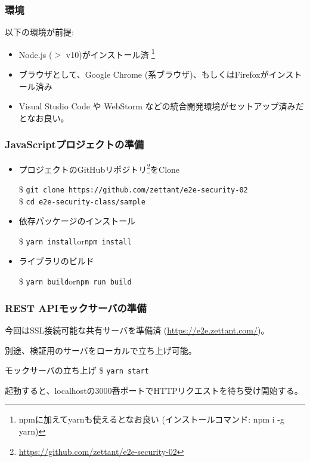 \documentclass[12pt,dvipdfmx]{beamer}
\begin{document}
\begin{frame}
\frametitle{環境}
以下の環境が前提:
\begin{itemize}
 \item Node.js ($>$ v10)がインストール済 \footnote[frame]{npmに加えてyarnも使えるとなお良い (インストールコマンド: npm i -g yarn)}
 \item ブラウザとして、Google Chrome (系ブラウザ)、もしくはFirefoxがインストール済み
 \item Visual Studio Code や WebStorm などの統合開発環境がセットアップ済みだとなお良い。
\end{itemize}
\end{frame}

\begin{frame}
\frametitle{JavaScriptプロジェクトの準備}
\begin{itemize}
\item プロジェクトのGitHubリポジトリ\footnote[frame]{\url{https://github.com/zettant/e2e-security-02}}をClone\\
\begin{exampleblock}{}
\footnotesize
\$ \texttt{git clone https://github.com/zettant/e2e-security-02}\\
\$ \texttt{cd e2e-security-class/sample}
\end{exampleblock}
\item 依存パッケージのインストール
\begin{exampleblock}{}
\$ \texttt{yarn install}\quad or\quad \texttt{npm install}
\end{exampleblock}
\item ライブラリのビルド
\begin{exampleblock}{}
\$ \texttt{yarn build}\quad or\quad \texttt{npm run build}
\end{exampleblock}
\end{itemize}
\end{frame}

\begin{frame}
\frametitle{REST APIモックサーバの準備}
今回はSSL接続可能な共有サーバを準備済 (\url{https://e2e.zettant.com/})。

\vspace{2ex}

別途、検証用のサーバをローカルで立ち上げ可能。
\begin{exampleblock}{\small モックサーバの立ち上げ}
\$ \texttt{yarn start}
\end{exampleblock}
起動すると、localhostの3000番ポートでHTTPリクエストを待ち受け開始する。
\end{frame}
\end{document}
